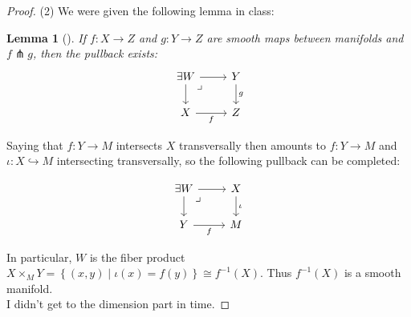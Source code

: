 \documentclass[reqno]{amsart}
\newtheorem{lemma}[theorem]{Lemma}
\theoremstyle{definition}
\theoremstyle{remark}
\begin{document}
    \begin{proof}
        (2) We were given the following lemma in class:
        \begin{lemma}[]
            If $f \colon X \to Z$ and
            $g \colon Y \to Z $ are smooth maps between manifolds
            and
            $f \pitchfork g$, then
            the pullback exists:
            \begin{equation*}
            \begin{tikzcd}
                \exists W \ar[r] \ar[d] \ar[dr, phantom,
                "\lrcorner", very near start]
                & Y \ar[d, "g"] \\
                X \ar[r, "f"'] & Z
            \end{tikzcd}
            \end{equation*}
            
        \end{lemma}
            Saying that $f \colon Y \to M$ intersects
            $X$ transversally then amounts to
            $f \colon Y \to M$ and
            $\iota \colon X \hookrightarrow M$ intersecting
            transversally, so the following pullback
            can be completed:

            \begin{equation*}
            \begin{tikzcd}
                \exists W \ar[r] \ar[d] \ar[dr, phantom,
                "\lrcorner", very near start]
                & X \ar[d, "\iota"] \\
                Y \ar[r, "f"'] & M
            \end{tikzcd}
            \end{equation*}

            In particular, $W$ is the fiber
            product
            $X \times_{M} Y = 
            \left\{ 
            (x,y)  \mid 
        \iota(x) = f(y) \right\} 
        \cong f^{-1}(X)$.
        Thus $f^{-1}(X)$ is a
        smooth manifold.\\

        I didn't get to the dimension part in time.




    \end{proof}



\printbibliography
\end{document}
